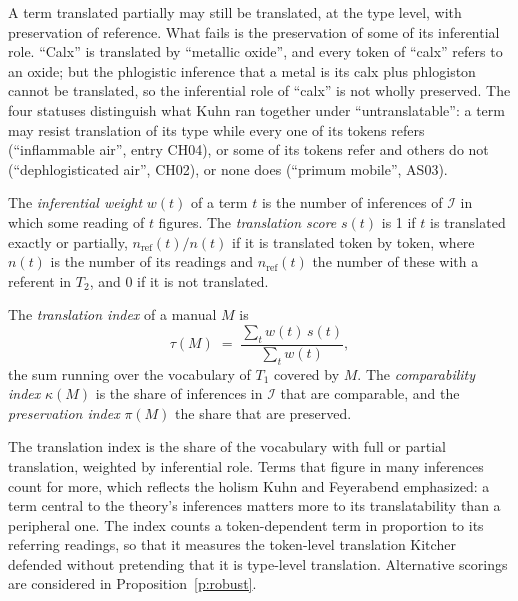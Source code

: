 \documentclass{situationist-preprint}
\begin{document}
A term translated partially may still be translated, at the type level, with preservation of reference. What fails is the preservation of some of its inferential role. \enquote{Calx} is translated by \enquote{metallic oxide}, and every token of \enquote{calx} refers to an oxide; but the phlogistic inference that a metal is its calx plus phlogiston cannot be translated, so the inferential role of \enquote{calx} is not wholly preserved. The four statuses distinguish what Kuhn ran together under \enquote{untranslatable}: a term may resist translation of its type while every one of its tokens refers (\enquote{inflammable air}, entry CH04), or some of its tokens refer and others do not (\enquote{dephlogisticated air}, CH02), or none does (\enquote{primum mobile}, AS03).

\begin{definition}\label{d:score}
The \emph{inferential weight} $w(t)$ of a term $t$ is the number of inferences of $\mathcal{I}$ in which some reading of $t$ figures. The \emph{translation score} $s(t)$ is 1 if $t$ is translated exactly or partially, $n_{\mathrm{ref}}(t)/n(t)$ if it is translated token by token, where $n(t)$ is the number of its readings and $n_{\mathrm{ref}}(t)$ the number of these with a referent in $T_2$, and 0 if it is not translated.
\end{definition}

\begin{definition}[Indices]\label{d:index}
The \emph{translation index} of a manual $M$ is
\[
\tau(M) \;=\; \frac{\sum_{t} w(t)\, s(t)}{\sum_t w(t)},
\]
the sum running over the vocabulary of $T_1$ covered by $M$. The \emph{comparability index} $\kappa(M)$ is the share of inferences in $\mathcal{I}$ that are comparable, and the \emph{preservation index} $\pi(M)$ the share that are preserved.
\end{definition}

The translation index is the share of the vocabulary with full or partial translation, weighted by inferential role. Terms that figure in many inferences count for more, which reflects the holism Kuhn and Feyerabend emphasized: a term central to the theory's inferences matters more to its translatability than a peripheral one. The index counts a token-dependent term in proportion to its referring readings, so that it measures the token-level translation Kitcher defended without pretending that it is type-level translation. Alternative scorings are considered in Proposition~\ref{p:robust}.
\end{document}
